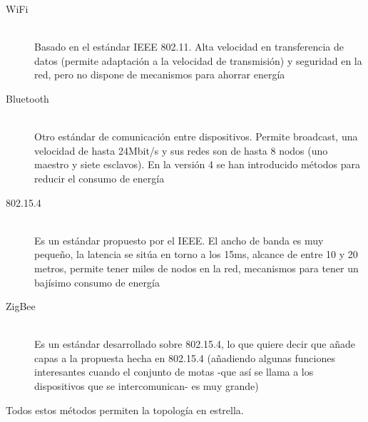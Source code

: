 \begin{description}
  \item[WiFi] \hfill \\
    Basado en el estándar IEEE 802.11. Alta velocidad en transferencia de datos
    (permite adaptación a la velocidad de transmisión) y seguridad en la red, pero
    no dispone de mecanismos para ahorrar energía
  \item[Bluetooth] \hfill \\
    Otro estándar de comunicación entre dispositivos. Permite broadcast, una velocidad
    de hasta 24Mbit/s y sus redes son de hasta 8 nodos (uno maestro y siete esclavos).
    En la versión 4 se han introducido métodos para reducir el consumo de energía
  \item[802.15.4] \hfill \\
    Es un estándar propuesto por el IEEE. El ancho de banda es muy pequeño, la latencia
    se sitúa en torno a los 15ms, alcance de entre 10 y 20 metros, permite tener miles
    de nodos en la red, mecanismos para tener un bajísimo consumo de energía
  \item[ZigBee] \hfill \\
    Es un estándar desarrollado sobre 802.15.4, lo que quiere decir que añade capas a la
    propuesta hecha en 802.15.4 (añadiendo algunas funciones interesantes cuando el conjunto
    de motas -que así se llama a los dispositivos que se intercomunican- es muy grande)
\end{description}

Todos estos métodos permiten la topología en estrella.\\

